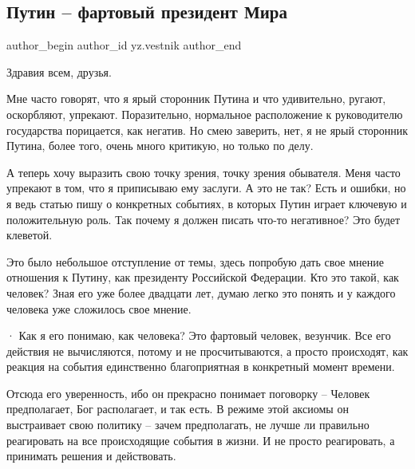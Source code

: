  
 
 
 
 
 
\subsection{Путин – фартовый президент Мира}
\label{sec:13_02_2022.yz.vestnik.1.putin_fartovyj_prezident_mira}
 
\ifcmt
 author_begin
   author_id yz.vestnik
 author_end
\fi

Здравия всем, друзья.

Мне часто говорят, что я ярый сторонник Путина и что удивительно, ругают,
оскорбляют, упрекают. Поразительно, нормальное расположение к руководителю
государства порицается, как негатив. Но смею заверить, нет, я не ярый сторонник
Путина, более того, очень много критикую, но только по делу.

А теперь хочу выразить свою точку зрения, точку зрения обывателя. Меня часто
упрекают в том, что я приписываю ему заслуги. А это не так? Есть и ошибки, но я
ведь статью пишу о конкретных событиях, в которых Путин играет ключевую и
положительную роль. Так почему я должен писать что-то негативное? Это будет
клеветой.

Это было небольшое отступление от темы, здесь попробую дать свое мнение
отношения к Путину, как президенту Российской Федерации. Кто это такой, как
человек? Зная его уже более двадцати лет, думаю легко это понять и у каждого
человека уже сложилось свое мнение.

· Как я его понимаю, как человека? Это фартовый человек, везунчик. Все его
действия не вычисляются, потому и не просчитываются, а просто происходят, как
реакция на события единственно благоприятная в конкретный момент времени.

Отсюда его уверенность, ибо он прекрасно понимает поговорку – Человек
предполагает, Бог располагает, и так есть. В режиме этой аксиомы он выстраивает
свою политику – зачем предполагать, не лучше ли правильно реагировать на все
происходящие события в жизни. И не просто реагировать, а принимать решения и
действовать.

